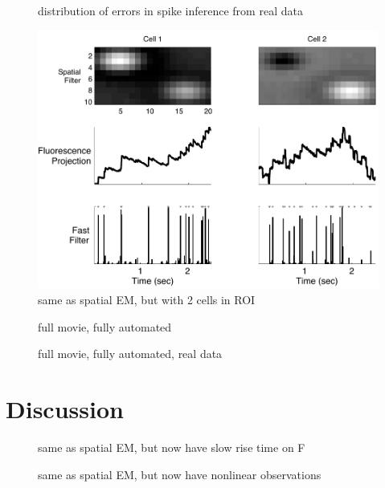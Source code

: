\begin{figure}
\caption{distribution of errors in spike inference from real data} \label{fig:err}
\end{figure}

\begin{figure}
\centering \includegraphics[width=.9\linewidth]{spatial_multi}
\caption{same as spatial EM, but with 2 cells in ROI} \label{fig:spatial_multi}
\end{figure}

\begin{figure}
\caption{full movie, fully automated} \label{fig:spatial_full}
\end{figure}

\begin{figure}
\caption{full movie, fully automated, real data} \label{fig:spatial_full_data}
\end{figure}

\section{Discussion}

\begin{figure}
\caption{same as spatial EM, but now have slow rise time on F} \label{fig:slow_rise}
\end{figure}

\begin{figure}
\caption{same as spatial EM, but now have nonlinear observations} \label{fig:nonlin}
\end{figure}

